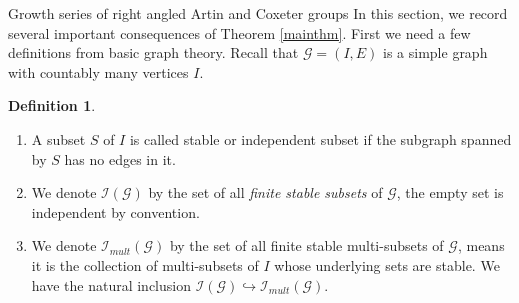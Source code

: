 \documentclass[11pt,reqno]{amsart}
\makeatletter
\numberwithin{equation}{section} %
\theoremstyle{definition}
\newtheorem{defn}{Definition}
\theoremstyle{remark}
\numberwithin{equation}{section}
\def\section{\def\@secnumfont{\mdseries}\@startsection{section}{1}%
  \z@{.7\linespacing\@plus\linespacing}{.5\linespacing}%
  {\normalfont\scshape\centering}}
\makeatother
\begin{document}
\section{Growth series of right angled Artin and Coxeter groups}\label{sect4}
In this section, we record several important consequences of Theorem \ref{mainthm}. First we need a few definitions from basic graph theory. Recall that $\mathcal{G}=(I, E)$ is a simple graph with countably many vertices $I.$
\begin{defn}
\begin{enumerate}
    \item A subset $S$ of $I$ is called stable or independent subset if the subgraph spanned by $S$ has no edges in it. 
    \item We denote $\mathcal I(\mathcal{G})$ by the set of all \textit{finite stable subsets} of $\mathcal{G}$, the empty set is independent by convention.
    \item We denote $\mathcal I_{mult}(\mathcal{G})$ by the set of all finite stable multi-subsets of $\mathcal{G}$, means it is the collection of multi-subsets of $I$ whose underlying sets are stable. We have the natural inclusion $\mathcal I(\mathcal{G})\hookrightarrow{} \mathcal I_{mult}(\mathcal{G}).$
\end{enumerate}
    
\end{defn}
\end{document}
